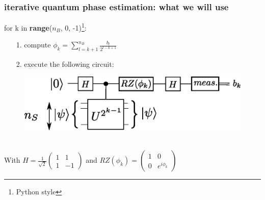 \documentclass{beamer}
\begin{document}
\begin{frame}
\frametitle{iterative quantum phase estimation: what we will use}

{\selectfont for k in \textbf{range}($n_{B}$, 0, -1)\footnote{Python style}:
\begin{itemize}
\item[1.] compute $\phi_{k}=\sum_{l=k+1}^{n_{B}} \frac{b_{l}}{2^{l-k+1}}$
\item[2.] execute the following circuit: 
\end{itemize}
}
\begin{figure}
\includegraphics[width=.6\textwidth]{iterative_pea.eps}
\end{figure}~\\

With $H=\frac{1}{\sqrt{2}}\begin{pmatrix}1 & 1 \\ 1 & -1 \end{pmatrix}$ and 
$RZ(\phi_{k})=\begin{pmatrix} 1 & 0 \\ 0 & e^{i\phi_{k}}\end{pmatrix}$

\end{frame}
\end{document}

